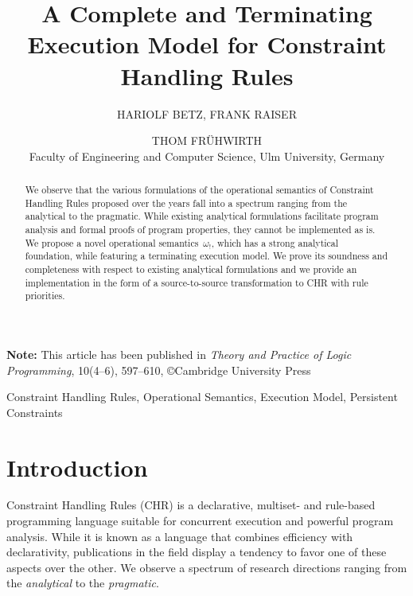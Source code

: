 \documentclass{tlp}
\newcommand{\bang}{\ensuremath{!}}
\newcommand{\obang}{\ensuremath{{\omega_\bang}}}
\begin{document}
\title{A Complete and Terminating Execution Model for Constraint Handling Rules}

\author[Hariolf Betz, Frank Raiser and Thom Fr{\"u}hwirth]{HARIOLF BETZ,
FRANK RAISER \and THOM FR{\"U}HWIRTH\\
Faculty of Engineering and Computer Science, Ulm University, Germany\\
}

\maketitle

\textbf{Note: } This article has been published in \textit{Theory and Practice
of Logic Programming}, 10(4--6), 597--610, \copyright Cambridge University Press

\begin{abstract}
We observe that the various formulations of the operational semantics of
Constraint Handling Rules proposed over the years fall into a spectrum ranging
from the analytical to the pragmatic.
While existing analytical formulations facilitate program
analysis and formal proofs of program properties, they cannot be implemented as is.
We propose a novel operational semantics~$\obang$, which has a strong
analytical foundation, while featuring a terminating execution model.
We prove its soundness and completeness with respect to existing analytical
formulations and we provide an implementation in the form of a source-to-source
transformation to CHR with rule priorities.
\end{abstract}

\begin{keywords}
Constraint Handling Rules, Operational Semantics, Execution Model, Persistent
Constraints
\end{keywords}

\section{Introduction}
\label{sec:intro}
Constraint Handling Rules \cite{fruehwirth09} (CHR) is a declarative, multiset-
and rule-based programming language suitable for concurrent execution and
powerful program analysis. While it is known as a language that combines
efficiency with declarativity, publications in the field display a tendency to
favor one of these aspects over the other. We observe a spectrum of research
directions ranging from the \emph{analytical} to the \emph{pragmatic}.
\end{document}
